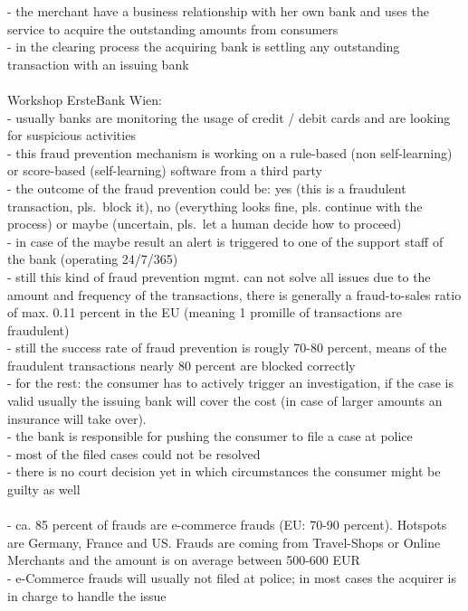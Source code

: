 - the merchant have a business relationship with her own bank and uses the service to acquire the outstanding amounts from consumers \\
- in the clearing process the acquiring bank is settling any outstanding transaction with an issuing bank \\
\\
Workshop ErsteBank Wien: \\
- usually banks are monitoring the usage of credit / debit cards and are looking for suspicious activities \\
- this fraud prevention mechanism is working on a rule-based (non self-learning) or score-based (self-learning) software from a third party \\
- the outcome of the fraud prevention could be: yes (this is a fraudulent transaction, pls.\ block it), no (everything looks fine, pls. continue with the process) or maybe (uncertain, pls.\ let a human decide how to proceed) \\
- in case of the maybe result an alert is triggered to one of the support staff of the bank (operating 24/7/365) \\
- still this kind of fraud prevention mgmt. can not solve all issues due to the amount and frequency of the transactions, there is generally a
fraud-to-sales ratio of max. 0.11 percent in the EU (meaning 1 promille of transactions are fraudulent) \\
- still the success rate of fraud prevention is rougly 70-80 percent, means of the fraudulent transactions nearly 80 percent are blocked correctly \\
- for the rest: the consumer has to actively trigger an investigation, if the case is valid usually the issuing bank will cover the cost (in case of larger amounts an insurance will take over). \\
- the bank is responsible for pushing the consumer to file a case at police \\
- most of the filed cases could not be resolved \\
- there is no court decision yet in which circumstances the consumer might be guilty as well \\
\\
- ca. 85 percent of frauds are e-commerce frauds (EU: 70-90 percent). Hotspots are Germany, France and US. Frauds are coming from Travel-Shops or Online Merchants and the amount is on average between 500-600 EUR \\
- e-Commerce frauds will usually not filed at police; in most cases the acquirer is in charge to handle the issue \\
